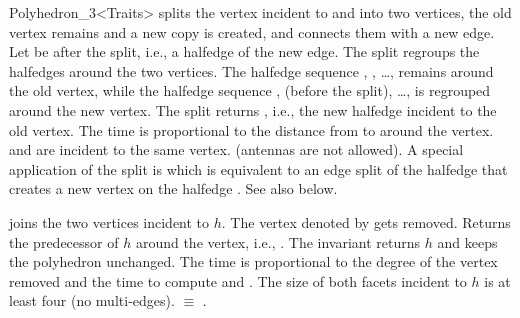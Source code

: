 \begin{ccRefClass}{Polyhedron_3<Traits>}
    {splits the vertex incident to  and  into two vertices,
    the old vertex remains and a new copy is created,
    and connects them with a new edge. Let  be 
     after the split, i.e., a halfedge
    of the new edge. The split regroups the halfedges around the two 
    vertices. The halfedge sequence , ,
    \ldots,  remains around the old vertex, while the 
    halfedge sequence ,  
    (before the split), \ldots,  is regrouped around the new
    vertex. The split returns , i.e., the new halfedge incident 
    to the old vertex. The time is proportional to the distance from 
     to  around the vertex.
    \ccPrecond {} and  are incident to the same vertex.
                (antennas are not allowed).
     A special application of the split is 
     which is equivalent to an 
    edge split of the halfedge  that creates a new 
    vertex on the halfedge . See also 
    below.}

    {joins the two vertices incident to $h$. The vertex denoted by
       gets removed. Returns the predecessor of
    $h$ around the vertex, i.e., . 
    The invariant  returns
    $h$ and keeps the polyhedron unchanged. 
    The time is proportional to the degree of the vertex removed and 
    the time to compute  and .
    \ccPrecond  The size of both facets incident to $h$ is at least 
    four (no multi-edges).
      $\equiv$ 
    .}



\end{ccRefClass}
